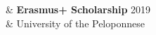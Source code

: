 %
{\color{gray}{Awards and Scholarships}} 
& \textbf{Erasmus+ Scholarship} \hfill 2019\\
& University of the Peloponnese \\
